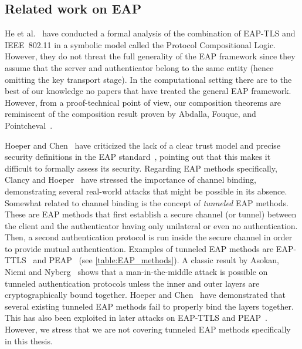 \subsection{Related work on EAP}\label{sec:generic_composition_results:modeling_EAP:related_work}
He et al.~\cite{CCS:HSDDM05} have conducted a formal analysis of the combination of EAP-TLS and IEEE~802.11 in a symbolic model called the Protocol Compositional Logic.
However,
they do not threat the full generality of the EAP framework since they assume that the server and authenticator belong to the same entity
(hence omitting the key transport stage).  
In the computational setting there are to the best of our knowledge no papers that have treated the general EAP framework. 
However,
from a proof-technical point of view,
our composition theorems are reminiscent of the composition result proven by Abdalla, Fouque, and Pointcheval~\cite{PKC:AbdFouPoi05}.
 

Hoeper and Chen~\cite{HoeperC:2007:EAP_claims_fail} have criticized the lack of a clear trust model and precise security definitions in the EAP standard~\cite{IETF:RFC3748:EAP},
pointing out that this makes it difficult to formally assess its security.
Regarding EAP methods specifically,
Clancy and Hoeper~\cite{ClancyH:2009:making_the_case_EAP_cb} have stressed the importance of channel binding,
demonstrating several real-world attacks that might be possible in its absence.
Somewhat related to channel binding is the concept of \emph{tunneled} EAP methods.
These are EAP methods that first establish a secure channel (or tunnel) between the client and the authenticator having only unilateral or even no authentication.
Then, a second authentication protocol is run inside the secure channel in order to provide mutual authentication.
Examples of tunneled EAP methods are EAP-TTLS~\cite{IETF:RFC5281:EAP-TTLS} and PEAP~\cite{IETF:draft:PEAPv2}
(see \cref{table:EAP_methods}).
A classic result by Asokan, Niemi and Nyberg~\cite{Asokan:2003:MitM-tunneling} shows that a man-in-the-middle attack is possible on tunneled authentication protocols unless the inner and outer layers are cryptographically bound together.
Hoeper and Chen~\cite{HoeperC:2010:inconvenient_tunneled} have demonstrated that several existing tunneled EAP methods fail to properly bind the layers together.
This has also been exploited in later attacks on EAP-TTLS and PEAP~\cite{SP:BDFPS14}.
However,
we stress that we are not covering tunneled EAP methods specifically in this thesis.


